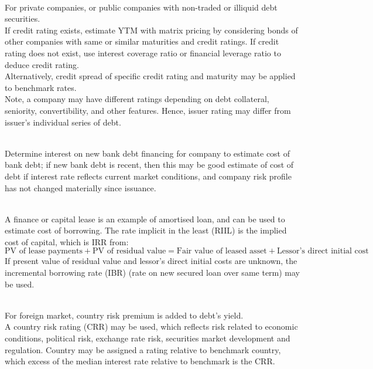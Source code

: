 \begin{method} \\
For private companies, or public companies with non-traded or illiquid debt securities.\\
If credit rating exists, estimate YTM with matrix pricing by considering bonds of other companies with same or similar maturities and credit ratings. If credit rating does not exist, use interest coverage ratio or financial leverage ratio to deduce credit rating.\\
Alternatively, credit spread of specific credit rating and maturity may be applied to benchmark rates.\\
Note, a company may have different ratings depending on debt collateral, seniority, convertibility, and other features. Hence, issuer rating may differ from issuer's individual series of debt.
\end{method}

\begin{method} \\
Determine interest on new bank debt financing for company to estimate cost of bank debt; if new bank debt is recent, then this may be good estimate of cost of debt if interest rate reflects current market conditions, and company risk profile has not changed materially since issuance.
\end{method}

\begin{method} \\
A finance or capital lease is an example of amortised loan, and can be used to estimate cost of borrowing. The rate implicit in the least (RIIL) is the implied cost of capital, which is IRR from:
\begin{equation}
\text{PV of lease payments} + \text{PV of residual value} = \text{Fair value of leased asset} + \text{Lessor's direct initial cost} \nonumber
\end{equation}
If present value of residual value and lessor's direct initial costs are unknown, the incremental borrowing rate (IBR) (rate on new secured loan over same term) may be used.
\end{method}

\begin{method} \\
For foreign market, country risk premium is added to debt's yield.\\
A country risk rating (CRR) may be used, which reflects risk related to economic conditions, political risk, exchange rate risk, securities market development and regulation. Country may be assigned a rating relative to benchmark country, which excess of the median interest rate relative to benchmark is the CRR.
\end{method}

